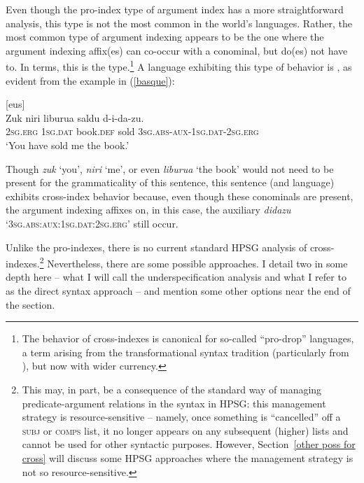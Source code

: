 \documentclass[output=paper,biblatex,babelshorthands,newtxmath,draftmode,colorlinks,citecolor=brown]{langscibook}
\begin{document}
Even though the pro-index type of argument index has a more straightforward analysis, this type is
not the most common in the world's languages. Rather, the most common type of argument indexing
appears to be the one where the argument indexing affix(es) can co-occur with a conominal, but
do(es) not have to.  In 
terms, this is the  type.\footnote{The behavior of cross-indexes is canonical for so-called ``pro-drop'' languages, a term arising from the transformational syntax tradition (particularly from \citealt[, Section~4.3]{Chomsky81a}), but now with wider currency.} A language exhibiting this type of behavior is , as evident from the example in (\ref{basque}):    
%
\begin{samepage}
\begin{exe}
\ex\label{basque}  [eus] \citep[98]{laka96} \\
\gll Zuk niri liburua saldu d-i-da-zu. \\
\textsc{2sg.erg} \textsc{1sg.dat} book.\textsc{def} sold \textsc{3sg.abs}-\textsc{aux}-\textsc{1sg.dat}-\textsc{2sg.erg} \\
\glt `You have sold me the book.' 
\end{exe} 
\end{samepage}
%
Though \textit{zuk} `you', \textit{niri} `me', or even \textit{liburua}  `the book' would not need to be present for the grammaticality of this sentence, this sentence (and language) exhibits cross-index behavior because, even though these conominals are present, the argument indexing affixes on, in this case, the auxiliary \textit{didazu} `\textsc{3sg.abs}:\-\textsc{aux}:\-\textsc{1sg.dat}:\-\textsc{2sg.erg}' still occur. 

Unlike the pro-indexes, there is no current standard HPSG analysis of cross-indexes.\footnote{This may, in part, be a consequence of the standard way of managing predicate-argument relations in the syntax in HPSG: this management strategy is resource-sensitive -- namely, once something is ``cancelled'' off a \textsc{subj} or \textsc{comps} list, it no longer appears on any subsequent (higher) lists and cannot be used for other syntactic purposes. However, Section~\ref{other poss for cross} will discuss some HPSG approaches where the management strategy is not so resource-sensitive.} Nevertheless, there are some possible approaches. I detail two in some depth here -- what I will call the underspecification analysis and what I refer to as the direct syntax approach -- and mention some other options near the end of the section.
\end{document}
